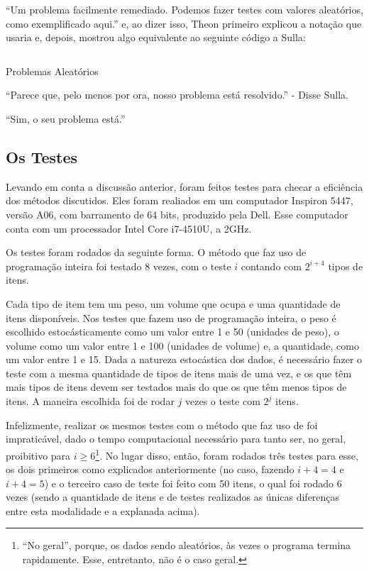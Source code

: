 \documentclass{article}
\begin{document}
  ``Um problema facilmente remediado. Podemos fazer testes com valores aleatórios, como exemplificado aqui.'' e, ao dizer isso, Theon
  primeiro explicou a notação que usaria e, depois, mostrou algo equivalente ao seguinte código a Sulla:

  \begin{listing}[H]
    \inputminted{prolog}{../Exemplos/Cap12/test/random.ecl}
    \caption{Problemas Aleatórios}\label{lst:random}
  \end{listing}

  ``Parece que, pelo menos por ora, nosso problema está resolvido.'' - Disse Sulla.

  ``Sim, o seu problema está.''






  \subsection{Os Testes}

  Levando em conta a discussão anterior, foram feitos testes para
  checar a eficiência dos métodos discutidos. Eles foram realiados em
  um computador Inspiron 5447, versão A06, com barramento de 64 bits,
  produzido pela Dell. Esse computador conta com um processador Intel
  Core i7-4510U, a 2GHz.

  Os testes foram rodados da seguinte forma. O método que faz uso de
  programação inteira foi testado 8 vezes, com o teste $i$ contando
  com  $2^{i+4}$ tipos de itens.

  Cada tipo de item tem um peso, um volume que ocupa e uma quantidade
  de itens disponíveis. Nos testes que fazem uso de programação
  inteira, o peso é escolhido
  estocásticamente como um valor entre 1 e 50 (unidades de peso), o
  volume como um valor
  entre 1 e 100 (unidades de volume) e, a quantidade, como um valor
  entre 1 e 15. Dada a natureza estocástica dos dados, é necessário
  fazer o teste com a mesma quantidade de tipos de itens mais de uma
  vez, e os que têm mais tipos de itens devem ser testados mais do que
  os que têm menos tipos de itens. A maneira escolhida foi de rodar
  $j$ vezes o teste com $2^j$ itens.

  Infelizmente, realizar os mesmos
  testes com o método que faz uso de 
  foi impraticável, dado o
  tempo computacional necessário para tanto ser, no geral,  proibitivo
  para $i \geq 6$\footnote{``No geral'', porque, os dados sendo
    aleatórios, às vezes o programa termina rapidamente. Esse,
    entretanto, não é o caso geral.}. No lugar disso, então, foram
  rodados três testes para esse, os dois primeiros como explicados
  anteriormente (no caso, fazendo $i + 4 = 4$ e $i + 4 = 5$) e o terceiro caso
  de teste foi feito com 50 itens, o qual foi rodado 6 vezes (sendo a
  quantidade de itens e de testes realizados as únicas diferenças entre
  esta modalidade e a explanada acima).
\end{document}

